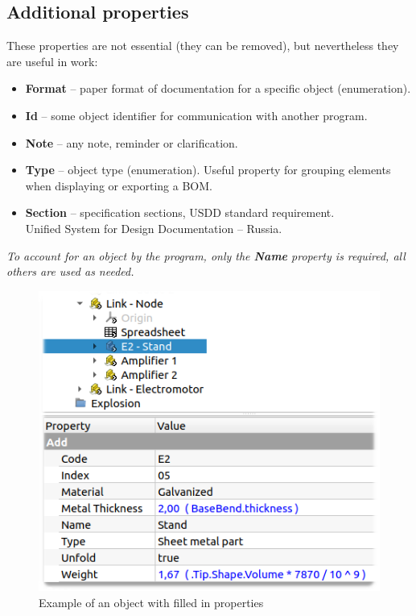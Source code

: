 \documentclass[a4paper,12pt]{article}
\begin{document}
\subsection{Additional properties}

These properties are not essential (they can be removed), but nevertheless they are useful in work:

\begin{itemize}
	\item \textbf{Format} -- paper format of documentation for a specific object (enumeration).
	\item \textbf{Id} -- some object identifier for communication with another program.
	\item \textbf{Note} -- any note, reminder or clarification.
	\item \textbf{Type} -- object type (enumeration). Useful property for grouping elements when displaying or exporting a BOM.
	\item \textbf{Section} -- specification sections, USDD standard requirement.\\Unified System for Design Documentation -- Russia.
\end{itemize}

\begin{center}\emph{To account for an object by the program, only the \textbf{Name} property is required, all others are used as needed.}\end{center}

\begin{figure}[htp]
	\centering
	\includegraphics[scale=0.8]{img/properties.png}
	\caption{Example of an object with filled in properties}
	\label{sec:properties}
\end{figure}
\end{document}
